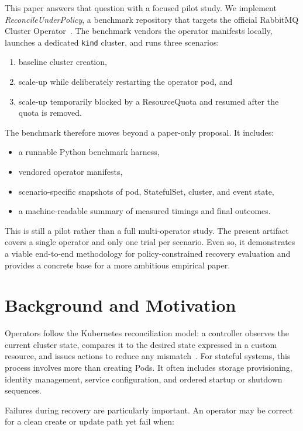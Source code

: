 \documentclass[11pt,a4paper]{article}
\begin{document}
This paper answers that question with a focused pilot study. We implement
\emph{ReconcileUnderPolicy}, a benchmark repository that targets the official
RabbitMQ Cluster Operator~\cite{rabbitmq-quickstart}. The benchmark vendors the
operator manifests locally, launches a dedicated \texttt{kind} cluster, and
runs three scenarios:

\begin{enumerate}
  \item baseline cluster creation,
  \item scale-up while deliberately restarting the operator pod, and
  \item scale-up temporarily blocked by a ResourceQuota and resumed after the
  quota is removed.
\end{enumerate}

The benchmark therefore moves beyond a paper-only proposal. It includes:

\begin{itemize}
  \item a runnable Python benchmark harness,
  \item vendored operator manifests,
  \item scenario-specific snapshots of pod, StatefulSet, cluster, and event
  state,
  \item a machine-readable summary of measured timings and final outcomes.
\end{itemize}

This is still a pilot rather than a full multi-operator study. The present
artifact covers a single operator and only one trial per scenario. Even so, it
demonstrates a viable end-to-end methodology for policy-constrained recovery
evaluation and provides a concrete base for a more ambitious empirical paper.

\section{Background and Motivation}

Operators follow the Kubernetes reconciliation model: a controller observes the
current cluster state, compares it to the desired state expressed in a custom
resource, and issues actions to reduce any mismatch~\cite{k8s-operator}. For
stateful systems, this process involves more than creating Pods. It often
includes storage provisioning, identity management, service configuration, and
ordered startup or shutdown sequences.

Failures during recovery are particularly important. An operator may be correct
for a clean create or update path yet fail when:
\end{document}
